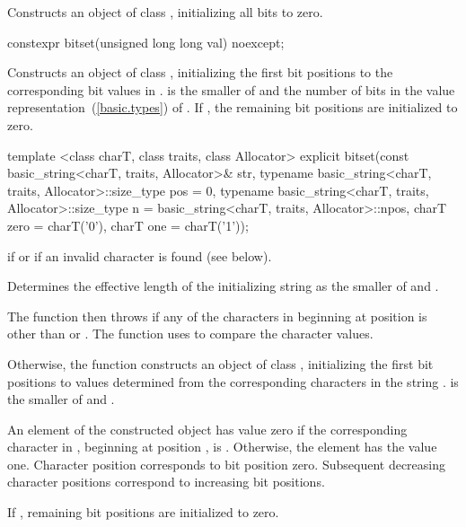 \begin{itemdescr}
\pnum
\effects
Constructs an object of class
,
initializing all bits to zero.
\end{itemdescr}

%
\begin{itemdecl}
constexpr bitset(unsigned long long val) noexcept;
\end{itemdecl}

\begin{itemdescr}
\pnum
\effects
Constructs an object of class
,
initializing the first  bit positions to the corresponding bit
values in .
 is the smaller of  and the number of bits in the value
representation~(\ref{basic.types}) of .
If , the remaining bit positions are initialized to zero.
\end{itemdescr}

%
\begin{itemdecl}
template <class charT, class traits, class Allocator>
explicit
bitset(const basic_string<charT, traits, Allocator>& str,
       typename basic_string<charT, traits, Allocator>::size_type pos = 0,
       typename basic_string<charT, traits, Allocator>::size_type n =
         basic_string<charT, traits, Allocator>::npos,
         charT zero = charT('0'), charT one = charT('1'));
\end{itemdecl}

\begin{itemdescr}
\pnum
\throws
{}
if
or  if an invalid character is found (see below).%

\pnum
\effects
Determines the effective length
 of the initializing string as the smaller of
 and
.

The function then throws%
if any of the 
characters in  beginning at position  is
other than  or . The function uses 
to compare the character values.

Otherwise, the function constructs an object of class
,
initializing the first  bit
positions to values determined from the corresponding characters in the string
.
 is the smaller of  and .

\pnum
An element of the constructed object has value zero if the
corresponding character in , beginning at position
, is
.
Otherwise, the element has the value one.
Character position  corresponds to bit position zero.
Subsequent decreasing character positions correspond to increasing bit positions.

\pnum
If , remaining bit positions are initialized to zero.
\end{itemdescr}

